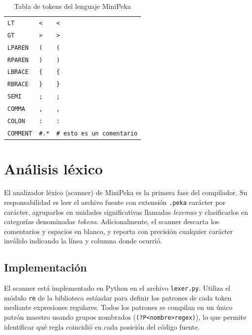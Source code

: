 \documentclass[12pt]{article}
\begin{document}
\begin{table}[H]
\begin{tabular}{@{}p{2.5cm} p{4.5cm} p{4.5cm}@{}}
\texttt{LT}         & \texttt{<}                            & \texttt{<} \\
\texttt{GT}         & \texttt{>}                            & \texttt{>} \\
\texttt{LPAREN}     & \texttt{(}                            & \texttt{(} \\
\texttt{RPAREN}     & \texttt{)}                            & \texttt{)} \\
\texttt{LBRACE}     & \texttt{\{}                           & \texttt{\{} \\
\texttt{RBRACE}     & \texttt{\}}                           & \texttt{\}} \\
\texttt{SEMI}       & \texttt{;}                            & \texttt{;} \\
\texttt{COMMA}      & \texttt{,}                            & \texttt{,} \\
\texttt{COLON}      & \texttt{:}                            & \texttt{:} \\
\texttt{COMMENT}    & \texttt{\#.*}                         & \texttt{\# esto es un comentario} \\
\bottomrule
\end{tabular}
\caption{Tabla de tokens del lenguaje MiniPeka}
\end{table}

\section{Análisis léxico}

El analizador léxico (scanner) de MiniPeka es la primera fase del compilador.
Su responsabilidad es leer el archivo fuente con extensión \texttt{.peka}
carácter por carácter, agruparlos en unidades significativas llamadas
\textit{lexemas} y clasificarlos en categorías denominadas \textit{tokens}.
Adicionalmente, el scanner descarta los comentarios y espacios en blanco,
y reporta con precisión cualquier carácter inválido indicando la línea y
columna donde ocurrió.

\subsection{Implementación}

El scanner está implementado en Python en el archivo \texttt{lexer.py}.
Utiliza el módulo \texttt{re} de la biblioteca estándar para definir los
patrones de cada token mediante expresiones regulares. Todos los patrones
se compilan en un único patrón maestro usando grupos nombrados
(\texttt{(?P<nombre>regex)}), lo que permite identificar qué regla
coincidió en cada posición del código fuente.
\end{document}
